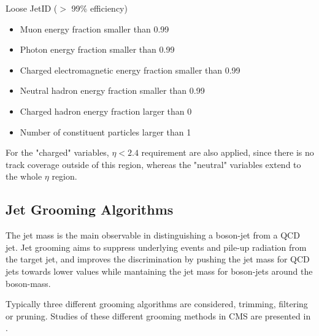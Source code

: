 Loose JetID ($>$ 99\% efficiency)
\begin{itemize}
\item Muon energy fraction smaller than 0.99
\item Photon energy fraction smaller than 0.99
\item Charged electromagnetic energy fraction smaller than 0.99
\item Neutral hadron energy fraction smaller than 0.99
\item Charged hadron energy fraction larger than 0
\item Number of constituent particles larger than 1
\end{itemize}

For the "charged" variables, $\eta < 2.4$ requirement are also applied, since there is no track coverage outside of this region, whereas the "neutral" variables extend to the whole $\eta$ region.

\subsection{Jet Grooming Algorithms}

The jet mass is the main observable in distinguishing a boson-jet from a QCD jet. Jet grooming aims to suppress underlying events and pile-up radiation from the target jet, and improves the discrimination by pushing the jet mass for QCD jets towards lower values while mantaining the jet mass for boson-jets around the boson-mass\cite{AN-12-137,AN-13-072}.

Typically three different grooming algorithms are considered, trimming\cite{JetTrim}, filtering\cite{JetFilter} or pruning\cite{JetPruned,JetPruned2}. Studies of these different grooming methods in CMS are presented in \cite{GroomCMS}.

